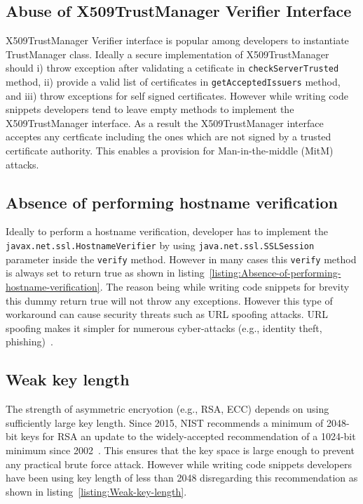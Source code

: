\subsection{Abuse of X509TrustManager Verifier Interface}
X509TrustManager Verifier interface is popular among developers to instantiate TrustManager class. 
Ideally a secure implementation of X509TrustManager should i) throw exception after validating a cetificate in \texttt{checkServerTrusted} method, 
ii) provide a valid list of certificates in \texttt{getAcceptedIssuers} method, 
and iii) throw exceptions for self signed certificates. However while writing code snippets developers tend to leave empty methods to implement  the X509TrustManager interface. 
As a result the X509TrustManager interface acceptes any certficate including the ones which are not signed by a trusted certificate authority. This enables a provision for Man-in-the-middle (MitM) attacks.


\subsection{Absence of performing hostname verification}


Ideally to perform a hostname verification, developer has to implement the \texttt{javax.net.ssl.HostnameVerifier} by 
using \texttt{java.net.\-ssl.SSLSession} parameter 
inside the \texttt{verify} method. However in many cases this \texttt{verify} method is always set to return true as shown in 
listing~\ref{listing:Absence-of-performing-hostname-verification}. 
The reason being while writing code snippets for brevity this dummy return true will not throw any exceptions.  
However this type of workaround can cause security threats such as URL spoofing attacks.  
URL spoofing makes it simpler for numerous cyber-attacks (e.g., identity theft, phishing)~\cite{url-spoofing}.

\subsection{Weak key length}
The strength of asymmetric encryotion (e.g., RSA, ECC) depends on using sufficiently large key length. 
Since 2015, NIST recommends a minimum of 2048-bit keys for RSA an update to the widely-accepted recommendation of a 1024-bit minimum 
since 2002~\cite{barker2009recommendation}. This ensures that the key space is large enough to prevent any practical brute force attack.   
However while writing  code snippets developers have been using key length of less than 2048 disregarding this recommendation as shown in listing~\ref{listing:Weak-key-length}.

